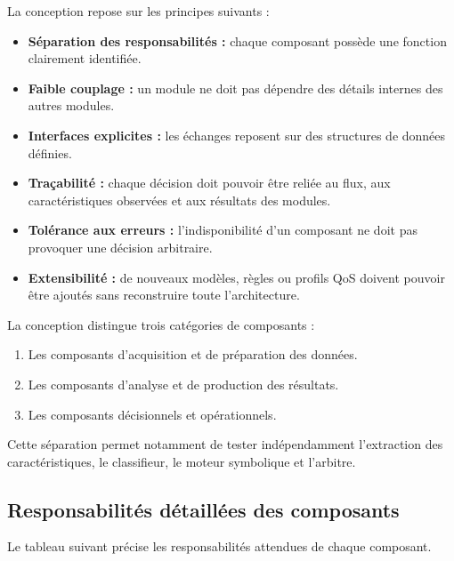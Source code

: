 La conception repose sur les principes suivants :

\begin{itemize}
    \item \textbf{Séparation des responsabilités :} chaque composant possède une fonction clairement identifiée.
    \item \textbf{Faible couplage :} un module ne doit pas dépendre des détails internes des autres modules.
    \item \textbf{Interfaces explicites :} les échanges reposent sur des structures de données définies.
    \item \textbf{Traçabilité :} chaque décision doit pouvoir être reliée au flux, aux caractéristiques observées et aux résultats des modules.
    \item \textbf{Tolérance aux erreurs :} l'indisponibilité d'un composant ne doit pas provoquer une décision arbitraire.
    \item \textbf{Extensibilité :} de nouveaux modèles, règles ou profils QoS doivent pouvoir être ajoutés sans reconstruire toute l'architecture.
\end{itemize}

La conception distingue trois catégories de composants :

\begin{enumerate}
    \item Les composants d'acquisition et de préparation des données.
    \item Les composants d'analyse et de production des résultats.
    \item Les composants décisionnels et opérationnels.
\end{enumerate}

Cette séparation permet notamment de tester indépendamment l'extraction des caractéristiques, le classifieur, le moteur symbolique et l'arbitre.

\subsection{Responsabilités détaillées des composants}

Le tableau suivant précise les responsabilités attendues de chaque composant.

